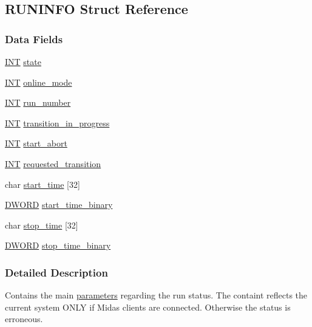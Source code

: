 \subsection{RUNINFO Struct Reference}
\label{structRUNINFO}
\subsubsection*{Data Fields}
\begin{DoxyCompactItemize}
\item 
\hyperlink{vppg_8h_a392e62da233ed3e2f7c3fd4f487a3896}{INT} \hyperlink{structRUNINFO_a7c400fc343d96a490a32bc64fca7be05}{state}
\item 
\hyperlink{vppg_8h_a392e62da233ed3e2f7c3fd4f487a3896}{INT} \hyperlink{structRUNINFO_a993c515f2187c544e338bf06c7064ec3}{online\_\-mode}
\item 
\hyperlink{vppg_8h_a392e62da233ed3e2f7c3fd4f487a3896}{INT} \hyperlink{structRUNINFO_ae34f31b041d6b30e555170811ef376ee}{run\_\-number}
\item 
\hyperlink{vppg_8h_a392e62da233ed3e2f7c3fd4f487a3896}{INT} \hyperlink{structRUNINFO_a28c09956d19bc4404e81094841389ae3}{transition\_\-in\_\-progress}
\item 
\hyperlink{vppg_8h_a392e62da233ed3e2f7c3fd4f487a3896}{INT} \hyperlink{structRUNINFO_ad651ba8d57963be72f85c87aebdc4b22}{start\_\-abort}
\item 
\hyperlink{vppg_8h_a392e62da233ed3e2f7c3fd4f487a3896}{INT} \hyperlink{structRUNINFO_a2a4b8247ea78b5463c30f427460cd16e}{requested\_\-transition}
\item 
char \hyperlink{structRUNINFO_a11fb9fb218581c46a448aa9fd3531b68}{start\_\-time} \mbox{[}32\mbox{]}
\item 
\hyperlink{vt2_8h_a798af1e30bc65f319c1a246cecf59e39}{DWORD} \hyperlink{structRUNINFO_a495a2887a420437a45c0a602758fcf34}{start\_\-time\_\-binary}
\item 
char \hyperlink{structRUNINFO_a3c0b44aedcf1670b74c1516f6702ee9f}{stop\_\-time} \mbox{[}32\mbox{]}
\item 
\hyperlink{vt2_8h_a798af1e30bc65f319c1a246cecf59e39}{DWORD} \hyperlink{structRUNINFO_a8561e123308cba90d8a024eb9f205052}{stop\_\-time\_\-binary}
\end{DoxyCompactItemize}


\subsubsection{Detailed Description}
Contains the main \hyperlink{structparameters}{parameters} regarding the run status. The containt reflects the current system ONLY if Midas clients are connected. Otherwise the status is erroneous. 

